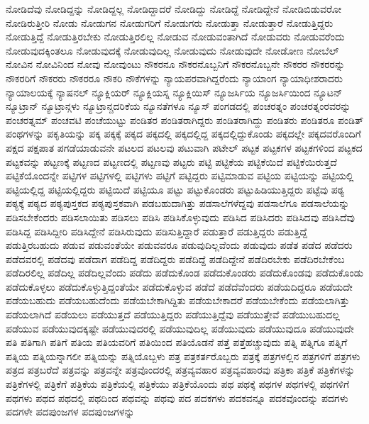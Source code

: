 {ನೋಡಿದೆವು
ನೋಡಿದ್ದನ್ನು
ನೋಡಿದ್ದಲ್ಲ
ನೋಡಿದ್ದಾದರೆ
ನೋಡಿದ್ದು
ನೋಡಿದ್ದೆ
ನೋಡಿದ್ದೇನೆ
ನೋಡಿಬಿಡುವರೋ
ನೋಡಿರುತ್ತೀರಿ
ನೋಡು
ನೋಡುಗನ
ನೋಡುಗರಿಗೆ
ನೋಡುಗರು
ನೋಡುತ್ತಾ
ನೋಡುತ್ತಾರೆ
ನೋಡುತ್ತಿದ್ದರು
ನೋಡುತ್ತಿದ್ದೆ
ನೋಡುತ್ತಿರಬೇಕು
ನೋಡುತ್ತಿರಲಿಲ್ಲ
ನೋಡುವ
ನೋಡುವಂತಾಗಿದೆ
ನೋಡುವರು
ನೋಡುವರೆಂದು
ನೋಡುವುದಕ್ಕಿಂತಲೂ
ನೋಡುವುದಕ್ಕೆ
ನೋಡುವುದಿಲ್ಲ
ನೋಡುವುದು
ನೋಡುವುದೇ
ನೋಡೋಣ
ನೋಬೆಲ್
ನೋವಿನ
ನೋವಿನಿಂದ
ನೋವು
ನೋವುಂಟು
ನೌಕರನೂ
ನೌಕರನೊಬ್ಬನಿಗೆ
ನೌಕರನೊಬ್ಬನೇ
ನೌಕರರ
ನೌಕರರನ್ನು
ನೌಕರರಿಗೆ
ನೌಕರರು
ನೌಕರರೂ
ನೌಕರಿ
ನೌಕೆಗಳನ್ನು
ನ್ಯಾಯಪರವಾಗಿದ್ದರೆಂದು
ನ್ಯಾಯಾಂಗ
ನ್ಯಾಯಾಧೀಶರಾದರು
ನ್ಯಾಯಾಲಯಕ್ಕೆ
ನ್ಯಾಷನಲ್
ನ್ಯೂಕ್ಲಿಯರ್
ನ್ಯೂಕ್ಲಿಯಸ್ನ
ನ್ಯೂಕ್ಲಿಯಿಸ್
ನ್ಯೂಜರ್ಸಿಯ
ನ್ಯೂಜರ್ಸಿಯಿಂದ
ನ್ಯೂಟನ್
ನ್ಯೂಟ್ರಾನ್
ನ್ಯೂಟ್ರಾನ್ಗಳು
ನ್ಯೂಟ್ರಾನ್ಚದರಿಕೆಯ
ನ್ಯೂನತೆಗಳೂ
ನ್ಯೂಸ್
ಪಂಗಡದಲ್ಲಿ
ಪಂಚರತ್ನಂ
ಪಂಚರತ್ನಂರವರನ್ನು
ಪಂಚರತ್ನಮ್
ಪಂಚವಟಿ
ಪಂಚೆಯುಟ್ಟು
ಪಂಡಿತರ
ಪಂಡಿತರಾಗಿದ್ದರು
ಪಂಡಿತರಾಗಿದ್ದು
ಪಂಡಿತರು
ಪಂಡಿತರೂ
ಪಂಡಿತ್
ಪಂಥಗಳನ್ನು
ಪಕೃತಿಯನ್ನು
ಪಕ್ಕ
ಪಕ್ಕಕ್ಕೆ
ಪಕ್ಕದ
ಪಕ್ಕದಲ್ಲಿ
ಪಕ್ಕದಲ್ಲಿದ್ದ
ಪಕ್ಕದಲ್ಲಿದ್ದುಕೊಂಡು
ಪಕ್ಕದಲ್ಲೇ
ಪಕ್ಕದವರೊಂದಿಗೆ
ಪಕ್ಷದ
ಪಕ್ಷಪಾತ
ಪಗಡೆಯಾಡುವನೇ
ಪಟಲದ
ಪಟಲವು
ಪಟುವಾಗಿ
ಪಟೇಲ್
ಪಟ್ಟಕ
ಪಟ್ಟಕಗಳ
ಪಟ್ಟಕಗಳಿಂದ
ಪಟ್ಟಕದ
ಪಟ್ಟಕವನ್ನು
ಪಟ್ಟಣಕ್ಕೆ
ಪಟ್ಟಣದ
ಪಟ್ಟಣದಲ್ಲಿ
ಪಟ್ಟಣವು
ಪಟ್ಟರು
ಪಟ್ಟಿ
ಪಟ್ಟಿಕೆಯ
ಪಟ್ಟಿಕೆಯಿದೆ
ಪಟ್ಟಿಕೆಯಿರುತ್ತದೆ
ಪಟ್ಟಿಕೆಯೊಂದನ್ನೇ
ಪಟ್ಟಿಗಳ
ಪಟ್ಟಿಗಳಲ್ಲಿ
ಪಟ್ಟಿಗಳು
ಪಟ್ಟಿಗೆ
ಪಟ್ಟಿದ್ದರು
ಪಟ್ಟಿಮಾಡುವ
ಪಟ್ಟಿಯ
ಪಟ್ಟಿಯನ್ನು
ಪಟ್ಟಿಯಲ್ಲಿ
ಪಟ್ಟಿಯಲ್ಲಿದ್ದ
ಪಟ್ಟಿಯಲ್ಲಿದ್ದರು
ಪಟ್ಟಿಯಿದೆ
ಪಟ್ಟಿಯೂ
ಪಟ್ಟು
ಪಟ್ಟುಕೊಂಡರು
ಪಟ್ಟುಹಿಡಿಯುತ್ತಿದ್ದರು
ಪಟ್ಟೆವು
ಪಠ್ಯ
ಪಠ್ಯಕ್ಕೆ
ಪಠ್ಯದ
ಪಠ್ಯಪುಸ್ತಕದ
ಪಠ್ಯಪುಸ್ತಕವಾಗಿ
ಪಡಬಹುದಾಗಿತ್ತು
ಪಡಸಾಲೆಗಳೆದ್ದವು
ಪಡಸಾಲೆಗೂ
ಪಡಸಾಲೆಯನ್ನು
ಪಡಿಸಬೇಕೆಂದರು
ಪಡಿಸಲಾಯಿತು
ಪಡಿಸಲು
ಪಡಿಸಿ
ಪಡಿಸಿಕೊಳ್ಳುವುದು
ಪಡಿಸಿದ
ಪಡಿಸಿದರು
ಪಡಿಸಿದವು
ಪಡಿಸಿದೆವು
ಪಡಿಸಿದ್ದ
ಪಡಿಸಿದ್ದೀರಿ
ಪಡಿಸಿದ್ದೇನೆ
ಪಡಿಸಿರುವುದು
ಪಡಿಸುತ್ತಿದ್ದಾರೆ
ಪಡುತ್ತಾರೆ
ಪಡುತ್ತಿದ್ದರು
ಪಡುತ್ತಿದ್ದೆ
ಪಡುತ್ತಿರಬಹುದು
ಪಡುವ
ಪಡುವಂತೆಯೇ
ಪಡುವವರೂ
ಪಡುವುದಿಲ್ಲವೆಂದು
ಪಡುವುದು
ಪಡೆತ
ಪಡೆದ
ಪಡೆದರು
ಪಡೆದವರಲ್ಲಿ
ಪಡೆದವು
ಪಡೆದಾಗ
ಪಡೆದಿದ್ದ
ಪಡೆದಿದ್ದರು
ಪಡೆದಿದ್ದೆ
ಪಡೆದಿದ್ದೇನೆ
ಪಡೆದಿರಬೇಕು
ಪಡೆದಿರಬೇಕೆಂಬ
ಪಡೆದಿರಲಿಲ್ಲ
ಪಡೆದಿಲ್ಲ
ಪಡೆದಿಲ್ಲವೆಂದು
ಪಡೆದು
ಪಡೆದುಕೊಂಡ
ಪಡೆದುಕೊಂಡರು
ಪಡೆದುಕೊಂಡವು
ಪಡೆದುಕೊಂಡು
ಪಡೆದುಕೊಳ್ಳಲು
ಪಡೆದುಕೊಳ್ಳುತ್ತಿದ್ದಂತೆಯೇ
ಪಡೆದುಕೊಳ್ಳುವ
ಪಡೆದೆ
ಪಡೆದೆವೆಂದರು
ಪಡೆಯದಿದ್ದರೂ
ಪಡೆಯದೇ
ಪಡೆಯಬಹುದು
ಪಡೆಯಬಹುದೆಂದು
ಪಡೆಯಬೇಕಾಗಿದ್ದಿತು
ಪಡೆಯಬೇಕಾದರೆ
ಪಡೆಯಬೇಕೆಂದು
ಪಡೆಯಲಾಗಿತ್ತು
ಪಡೆಯಲಾಗಿದೆ
ಪಡೆಯಲು
ಪಡೆಯುತ್ತದೆ
ಪಡೆಯುತ್ತಿದ್ದರು
ಪಡೆಯುತ್ತಿದ್ದೆವು
ಪಡೆಯುತ್ತೇವೆ
ಪಡೆಯುಬಹುದಲ್ಲ
ಪಡೆಯುವ
ಪಡೆಯುವುದಕ್ಕಷ್ಟೇ
ಪಡೆಯುವುದರಲ್ಲಿ
ಪಡೆಯುವುದಿಲ್ಲ
ಪಡೆಯುವುದು
ಪಡೆಯುವುದೂ
ಪಡೆಯುವುದೇ
ಪತಿ
ಪತಿಗಾಗಿ
ಪತಿಗೆ
ಪತಿಯ
ಪತಿಯವರಿಗೆ
ಪತಿಯಿಂದ
ಪತಿಯೊಡನೆ
ಪತ್ತೆ
ಪತ್ತೆಹಚ್ಚುವುದು
ಪತ್ನಿ
ಪತ್ನಿಗೂ
ಪತ್ನಿಗೆ
ಪತ್ನಿಯ
ಪತ್ನಿಯನ್ನಾಗಲೀ
ಪತ್ನಿಯನ್ನು
ಪತ್ನಿಯೊಬ್ಬಳು
ಪತ್ರ
ಪತ್ರಕರ್ತರೊಬ್ಬರು
ಪತ್ರಕ್ಕೆ
ಪತ್ರಗಳಲ್ಲಿನ
ಪತ್ರಗಳಿಗೆ
ಪತ್ರಗಳು
ಪತ್ರದ
ಪತ್ರಬರೆದೆ
ಪತ್ರವನ್ನು
ಪತ್ರವನ್ನೇ
ಪತ್ರವೊಂದರಲ್ಲಿ
ಪತ್ರವ್ಯವಹಾರ
ಪತ್ರವ್ಯವಹಾರವು
ಪತ್ರಿಕಾ
ಪತ್ರಿಕೆ
ಪತ್ರಿಕೆಗಳನ್ನು
ಪತ್ರಿಕೆಗಳಲ್ಲಿ
ಪತ್ರಿಕೆಗೆ
ಪತ್ರಿಕೆಯ
ಪತ್ರಿಕೆಯಲ್ಲಿ
ಪತ್ರಿಕೆಯು
ಪತ್ರಿಕೆಯೊಂದು
ಪಥ
ಪಥಕ್ಕೆ
ಪಥಗಳ
ಪಥಗಳಲ್ಲಿ
ಪಥಗಳಿಗೆ
ಪಥಗಳು
ಪಥದ
ಪಥದಲ್ಲಿ
ಪಥದಿಂದ
ಪಥವನ್ನು
ಪಥವು
ಪದ
ಪದಕಗಳು
ಪದಕವನ್ನೂ
ಪದಕವೊಂದನ್ನು
ಪದಗಳು
ಪದಗಳೇ
ಪದಪುಂಜಗಳ
ಪದಪುಂಜಗಳನ್ನು
}
